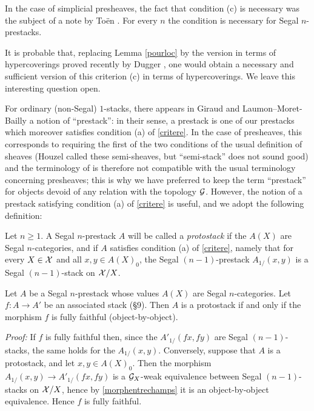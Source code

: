 In the case of simplicial presheaves, the fact that condition (c) is necessary
was the subject of a note by Toën \cite{ToenDescente}.
For every $n$ the condition is necessary for Segal $n$-prestacks.

It is probable that, replacing Lemma \ref{pourloc} by the version in terms of
hypercoverings proved recently by Dugger \cite{Dugger},
one would obtain a necessary and sufficient version of this criterion (c) in
terms of hypercoverings. We leave this interesting question open.





For ordinary (non-Segal) $1$-stacks, there appears in Giraud \cite{GiraudThese}
and Laumon--Moret-Bailly \cite{LaumonMB} a notion of ``prestack'': in their
sense, a prestack is one of our prestacks which moreover satisfies condition
(a) of \ref{critere}. In the case of presheaves, this corresponds to requiring
the first of the two conditions of the usual definition of sheaves (Houzel
called these semi-sheaves, but ``semi-stack'' does not sound good) and the
terminology of \cite{GiraudThese} \cite{LaumonMB} is therefore not compatible
with the usual terminology concerning presheaves; this is why we have
preferred to keep the term ``prestack'' for objects devoid of any relation with
the topology ${\cal G}$. However, the notion of a prestack satisfying condition (a)
of \ref{critere} is useful, and we adopt the following definition:

\begin{definition}
Let $n\geq 1$.
A Segal $n$-prestack $A$ will be called a {\em protostack} if the $A(X)$ are
Segal $n$-categories, and if $A$ satisfies condition (a) of \ref{critere},
namely that for every $X\in {\cal X}$ and all $x,y\in A(X)_0$, the Segal
$(n-1)$-prestack $A_{1/}(x,y)$ is a Segal $(n-1)$-stack on ${\cal X} /X$.
\end{definition}


\begin{lemma}
Let $A$ be a Segal $n$-prestack whose values $A(X)$ are Segal
$n$-ca\-te\-go\-ries. Let $f:A\rightarrow A'$ be an associated stack
(\S 9). Then $A$ is a protostack if and only if the morphism $f$ is fully
faithful (object-by-object).
\end{lemma}
{\em Proof:}
If $f$ is fully faithful then, since the $A'_{1/}(fx,fy)$ are Segal
$(n-1)$-stacks, the same holds for the $A_{1/}(x,y)$. Conversely, suppose that
$A$ is a protostack, and let $x,y\in A(X)_0$.
Then the morphism $A_{1/}(x,y)\rightarrow A'_{1/}(fx,fy)$ is a
${\cal G}_X$-weak equivalence between Segal $(n-1)$-stacks on ${\cal X} /X$, hence by
\ref{morphentrechamps} it is an object-by-object equivalence.
Hence $f$ is fully faithful.
\eop

